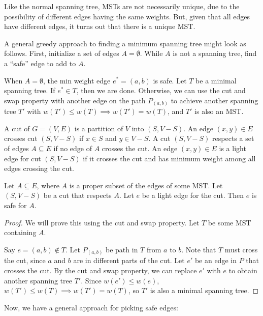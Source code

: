 Like the normal spanning tree, MSTs are not necessarily unique, due to the possibility of different edges having the same weights. But, given that all edges have different edges, it turns out that there is a unique MST. 

A general greedy approach to finding a minimum spanning tree might look as follows. First, initialize a set of edges $A=\emptyset$. While $A$ is not a spanning tree, find a ``safe'' edge to add to $A$. 
    
When $A=\emptyset$, the min weight edge $e^*=(a,b)$ is safe. Let $T$ be a minimal spanning tree. If $e^*\in T$, then we are done. Otherwise, we can use the cut and swap property with another edge on the path $P_{(a,b)}$ to achieve another spanning tree $T'$ with $w(T')\leq w(T)\implies w(T')=w(T)$, and $T'$ is also an MST.

\begin{definition}

A \ac{cut} of $G=(V,E)$ is a partition of $V$ into $(S, V-S)$. An edge $(x,y)\in E$ \ac{crosses cut} $(S, V-S)$ if $x\in S$ and $y\in V-S$. A cut $(S, V-S)$ \ac{respects} a set of edges $A\subseteq E$ if no edge of $A$ crosses the cut. An edge $(x,y)\in E$ is a \ac{light edge} for cut $(S, V-S)$ if it crosses the cut and has minimum weight among all edges crossing the cut. 
\end{definition}

\begin{theorem}
\thmlabel

Let $A\subseteq E$, where $A$ is a proper subset of the edges of some MST. Let $(S, V-S)$ be a cut that respects $A$. Let $e$ be a light edge for the cut. Then $e$ is safe for $A$. 
\end{theorem}

\begin{proof}
We will prove this using the cut and swap property. Let $T$ be some MST containing $A$. 

Say $e=(a,b)\notin T$. Let $P_{(a,b)}$ be path in $T$ from $a$ to $b$. Note that $T$ must cross the cut, since $a$ and $b$ are in different parts of the cut. Let $e'$ be an edge in $P$ that crosses the cut. By the cut and swap property, we can replace $e'$ with $e$ to obtain another spanning tree $T'$. Since $w(e')\leq w(e)$, $w(T')\leq w(T)\implies w(T')=w(T)$, so $T'$ is also a minimal spanning tree. 
\end{proof}

Now, we have a general approach for picking safe edges:


